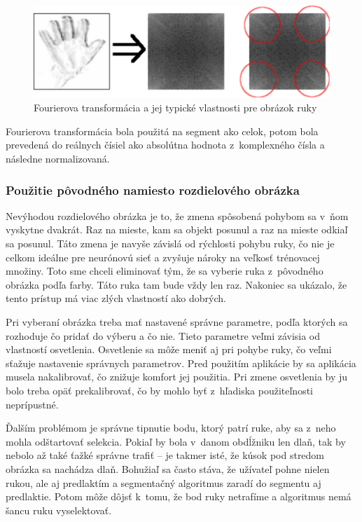 \begin{figure}[htp]
    \centering
    \includegraphics[width=\textwidth]{images/fft_preview}
    \caption{Fourierova transformácia a jej typické vlastnosti pre obrázok ruky}
    \label{fig:fft}
\end{figure}

Fourierova transformácia bola použitá na segment ako celok, potom bola prevedená do reálnych čísiel ako absolútna hodnota z~komplexného čísla a následne normalizovaná.

\subsubsection{Použitie pôvodného namiesto rozdielového obrázka}
Nevýhodou rozdielového obrázka je to, že zmena spôsobená pohybom sa v~ňom vyskytne dvakrát. Raz na mieste, kam sa objekt posunul a raz na mieste odkiaľ sa posunul. Táto zmena je navyše závislá od rýchlosti pohybu ruky, čo nie je celkom ideálne pre neurónovú sieť a zvyšuje nároky na veľkosť trénovacej množiny. Toto sme chceli eliminovať tým, že sa vyberie ruka z~pôvodného obrázka podľa farby. Táto ruka tam bude vždy len raz. Nakoniec sa ukázalo, že tento prístup má viac zlých vlastností ako dobrých.

Pri vyberaní obrázka treba mať nastavené správne parametre, podľa ktorých sa rozhoduje čo pridať do výberu a čo nie. Tieto parametre veľmi závisia od vlastností osvetlenia. Osvetlenie sa môže meniť aj pri pohybe ruky, čo veľmi sťažuje nastavenie správnych parametrov. Pred použitím aplikácie by sa aplikácia musela nakalibrovať, čo znižuje komfort jej použitia. Pri zmene osvetlenia by ju bolo treba opäť prekalibrovať, čo by mohlo byť z~hľadiska použiteľnosti neprípustné.

Ďalším problémom je správne tipnutie bodu, ktorý patrí ruke, aby sa z~neho mohla odštartovať selekcia. Pokiaľ by bola v~danom obdĺžniku len dlaň, tak by nebolo až také ťažké správne trafiť -- je takmer isté, že kúsok pod stredom obrázka sa nachádza dlaň. Bohužiaľ sa často stáva, že užívateľ pohne nielen rukou, ale aj predlaktím a segmentačný algoritmus zaradí do segmentu aj predlaktie. Potom môže dôjsť k~tomu, že bod ruky netrafíme a algoritmus nemá šancu ruku vyselektovať.

